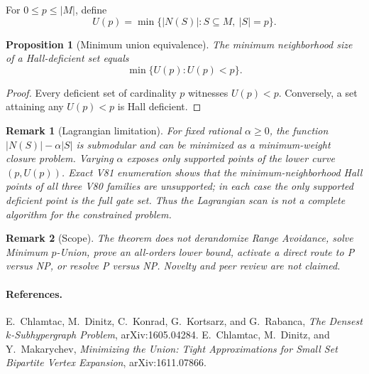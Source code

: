 \documentclass[11pt]{article}
\newtheorem{proposition}{Proposition}
\newtheorem{remark}{Remark}
\begin{document}
For $0\leq p\leq |M|$, define
\[
 U(p)=\min\{|N(S)|:S\subseteq M,\ |S|=p\}.
\]

\begin{proposition}[Minimum union equivalence]
The minimum neighborhood size of a Hall-deficient set equals
\[
 \min\{U(p):U(p)<p\}.
\]
\end{proposition}

\begin{proof}
Every deficient set of cardinality $p$ witnesses $U(p)<p$.  Conversely, a
set attaining any $U(p)<p$ is Hall deficient.
\end{proof}

\begin{remark}[Lagrangian limitation]
For fixed rational $\alpha\geq0$, the function
$|N(S)|-\alpha|S|$ is submodular and can be minimized as a minimum-weight
closure problem.  Varying $\alpha$ exposes only supported points of the lower
curve $(p,U(p))$.  Exact V81 enumeration shows that the minimum-neighborhood
Hall points of all three V80 families are unsupported; in each case the only
supported deficient point is the full gate set.  Thus the Lagrangian scan is
not a complete algorithm for the constrained problem.
\end{remark}

\begin{remark}[Scope]
The theorem does not derandomize Range Avoidance, solve Minimum $p$-Union,
prove an all-orders lower bound, activate a direct route to P versus NP, or
resolve P versus NP.  Novelty and peer review are not claimed.
\end{remark}

\paragraph{References.}
E.~Chlamtac, M.~Dinitz, C.~Konrad, G.~Kortsarz, and G.~Rabanca,
\emph{The Densest $k$-Subhypergraph Problem}, arXiv:1605.04284.
E.~Chlamtac, M.~Dinitz, and Y.~Makarychev,
\emph{Minimizing the Union: Tight Approximations for Small Set Bipartite
Vertex Expansion}, arXiv:1611.07866.
\end{document}
